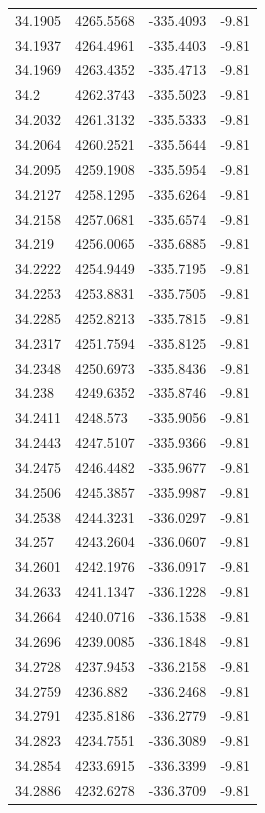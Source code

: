 \begin{table}[H]
\begin{tabular}{llll}
34.1905 & 4265.5568 & -335.4093 & -9.81 \\
34.1937 & 4264.4961 & -335.4403 & -9.81 \\
34.1969 & 4263.4352 & -335.4713 & -9.81 \\
34.2 & 4262.3743 & -335.5023 & -9.81 \\
34.2032 & 4261.3132 & -335.5333 & -9.81 \\
34.2064 & 4260.2521 & -335.5644 & -9.81 \\
34.2095 & 4259.1908 & -335.5954 & -9.81 \\
34.2127 & 4258.1295 & -335.6264 & -9.81 \\
34.2158 & 4257.0681 & -335.6574 & -9.81 \\
34.219 & 4256.0065 & -335.6885 & -9.81 \\
34.2222 & 4254.9449 & -335.7195 & -9.81 \\
34.2253 & 4253.8831 & -335.7505 & -9.81 \\
34.2285 & 4252.8213 & -335.7815 & -9.81 \\
34.2317 & 4251.7594 & -335.8125 & -9.81 \\
34.2348 & 4250.6973 & -335.8436 & -9.81 \\
34.238 & 4249.6352 & -335.8746 & -9.81 \\
34.2411 & 4248.573 & -335.9056 & -9.81 \\
34.2443 & 4247.5107 & -335.9366 & -9.81 \\
34.2475 & 4246.4482 & -335.9677 & -9.81 \\
34.2506 & 4245.3857 & -335.9987 & -9.81 \\
34.2538 & 4244.3231 & -336.0297 & -9.81 \\
34.257 & 4243.2604 & -336.0607 & -9.81 \\
34.2601 & 4242.1976 & -336.0917 & -9.81 \\
34.2633 & 4241.1347 & -336.1228 & -9.81 \\
34.2664 & 4240.0716 & -336.1538 & -9.81 \\
34.2696 & 4239.0085 & -336.1848 & -9.81 \\
34.2728 & 4237.9453 & -336.2158 & -9.81 \\
34.2759 & 4236.882 & -336.2468 & -9.81 \\
34.2791 & 4235.8186 & -336.2779 & -9.81 \\
34.2823 & 4234.7551 & -336.3089 & -9.81 \\
34.2854 & 4233.6915 & -336.3399 & -9.81 \\
34.2886 & 4232.6278 & -336.3709 & -9.81 \\

\end{tabular}
\end{table}
